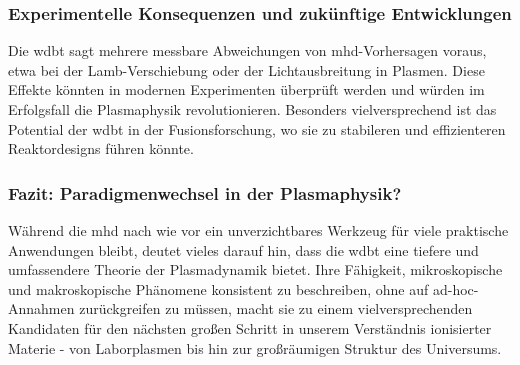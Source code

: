 \subsubsection{Experimentelle Konsequenzen und zukünftige Entwicklungen}
Die \gls{wdbt} sagt mehrere messbare Abweichungen von \gls{mhd}-Vorhersagen voraus, etwa bei der Lamb-Verschiebung oder der Lichtausbreitung in Plasmen. Diese Effekte könnten in
modernen Experimenten überprüft werden und würden im Erfolgsfall die Plasmaphysik revolutionieren. Besonders vielversprechend ist das Potential der \gls{wdbt} in der
Fusionsforschung, wo sie zu stabileren und effizienteren Reaktordesigns führen könnte.

\subsubsection{Fazit: Paradigmenwechsel in der Plasmaphysik?}
Während die \gls{mhd} nach wie vor ein unverzichtbares Werkzeug für viele praktische Anwendungen bleibt, deutet vieles darauf hin, dass die \gls{wdbt} eine tiefere und umfassendere
Theorie der Plasmadynamik bietet. Ihre Fähigkeit, mikroskopische und makroskopische Phänomene konsistent zu beschreiben, ohne auf ad-hoc-Annahmen zurückgreifen zu müssen, macht
sie zu einem vielversprechenden Kandidaten für den nächsten großen Schritt in unserem Verständnis ionisierter Materie - von Laborplasmen bis hin zur großräumigen Struktur des
Universums.
